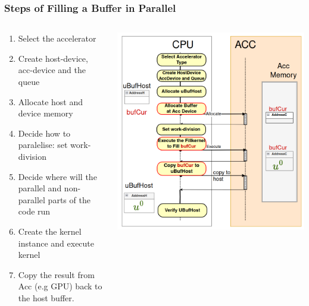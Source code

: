 \documentclass[9pt]{beamer}
\begin{document}
\begin{frame}
\frametitle{Steps of Filling a Buffer in Parallel}
\begin{columns}

    \begin{column}{0.55\textwidth} %
    \begin{enumerate}
     \item Select the accelerator
     \item Create host-device, acc-device and the queue
     \item Allocate host and device memory
     \item Decide how to paralelise: set work-division
     \item Decide where will the parallel and non-parallel parts of the code run
     \item Create the kernel instance and execute kernel
     \item Copy the result from Acc (e.g GPU) back to the host buffer.
    \end{enumerate}
    \end{column}

    \begin{column}{0.45\textwidth} %
        \centering
        \includegraphics[width=\linewidth]{Screenshot from 2024-09-25 12-39-55.png} %
    \end{column}

\end{columns}


    \end{frame}
\end{document}
